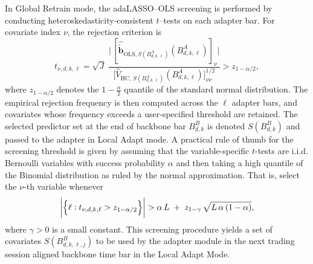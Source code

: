 \documentclass[10pt,a4paper,oneside]{article}
\DeclarePairedDelimiter{\aval}{\lvert}{\rvert} %
\begin{document}
In Global Retrain mode, the adaLASSO–OLS screening is performed by conducting heteroskedasticity‐consistent \(t\)–tests on each adapter bar.  For covariate index \(\nu\), the rejection criterion is
\[
    t_{\nu,d,k,\ell} = \sqrt{J}\;
    \frac{\bigl|\,[\hat{\tilde{\mathbf b}}_{\mathrm{OLS},S(B^A_{d,k,\ell})}(B^A_{d,k,\ell})]_{\nu}\bigr|}{\bigl[\hat V_{\mathrm{HC},\,S(B^A_{d,k,\ell})}(B^A_{d,k,\ell})\bigr]_{\nu\nu}^{1/2}}
    > z_{1-\alpha/2},
\]
where \(z_{1-\alpha/2}\) denotes the \(1-\tfrac\alpha2\) quantile of the standard normal distribution.  The empirical rejection frequency is then computed across the \(\ell\) adapter bars, and covariates whose frequency exceeds a user‐specified threshold are retained.  The selected predictor set at the end of backbone bar \(B^B_{d,k}\) is denoted \(S(B^B_{d,k})\) and passed to the adapter in Local Adapt mode.  A practical rule of thumb for the screening threshold is  given by assuming that the variable-specific \(t\)-tests are i.i.d. Bernoulli variables with success probability $\alpha$ and then taking a high quantile of the Binomial distribution as ruled by the normal approximation. That is, select the $\nu$-th variable whenever
\[
    \aval*{ \left\{\ell : t_{\nu,d,k,\ell} > z_{1 - \alpha/2}\right\}} > \alpha\,L \;+\; z_{1-\gamma}\,\sqrt{L\,\alpha\,(1-\alpha)},
\]
where \(\gamma>0\) is a small constant. This screening procedure yields a set of covariates $S\left( B^B_{d,k,\ell,j} \right)$ to be used by the adapter module in the next trading session aligned backbone time bar in the Local Adapt Mode.


\end{document}
